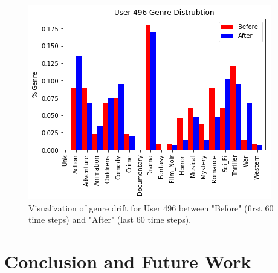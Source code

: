 \documentclass{article}
\begin{document}
\begin{figure}[ht]

\begin{center}
\centerline{\includegraphics[width=\columnwidth]{drift_histogram}}
\caption{Visualization of genre drift for User 496 between "Before" (first 60 time steps) and "After" (last 60 time steps).}
\label{drift_histogram}
\end{center}

\vskip -0.2in
\end{figure}

\section{Conclusion and Future Work}

\nocite{kawale2015efficient}
\nocite{wang2017online}
\nocite{zhao2013interactive}
\nocite{cherkassky2013sequential}
\nocite{arulampalam2002tutorial}
\nocite{douc2005comparison}
\nocite{doucet2009tutorial}
\nocite{orhan2012particle}
\nocite{lo2017temporal}
\nocite{lindsten2015rao}



\end{document}
